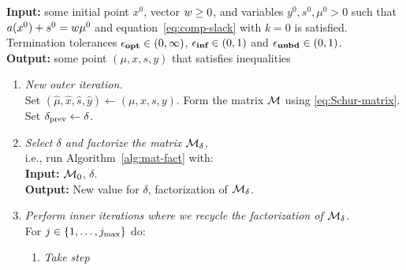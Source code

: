 \documentclass{article}
\begin{document}

\begin{algorithm}[H]
\textbf{Input:} some initial point $x^{0}$, vector $w \ge 0$, and variables $y^{0}, s^{0}, \mu^0 > 0$  such that $a(x^{0}) + s^{0} = w \mu^{0}$ and equation~\eqref{eq:comp-slack} with $k=0$ is satisfied. Termination tolerances $\epsilon_{\textbf{opt}} \in (0,\infty)$, $\epsilon_{\textbf{inf}} \in (0,1)$ and $\epsilon_{\textbf{unbd}} \in (0,1)$. \\
\textbf{Output:} some point $(\mu, x, s, y)$ that satisfies inequalities \termination{}
\vspace{0.1 cm} %
\begin{enumerate}[label*=A.{\arabic*}]
\item \label{line:form-K}  \emph{New outer iteration.} \\
Set $(\hat{\mu}, \hat{x}, \hat{s}, \hat{y}) \gets (\mu, x, s, y)$. Form the matrix $\mathcal{M}$ using \eqref{eq:Schur-matrix}. Set $\delta_{\text{prev}} \gets \delta$.
\item \emph{Select $\delta$ and factorize the matrix $\mathcal{M}_{\delta}$,} \\
i.e., run Algorithm~\ref{alg:mat-fact} with: \\
\hspace*{0.1cm}  \textbf{Input:} $\mathcal{M}_{0}$, $\delta$. \\
\hspace*{0.1cm} \textbf{Output:} New value for $\delta$, factorization of $\mathcal{M}_{\delta}$.
\item \label{take-steps}  \emph{Perform inner iterations where we recycle the factorization of $\mathcal{M}_{\delta}$.} \\
For $j \in \{ 1, \dots , j_{\max} \}$ do:
\begin{enumerate}[label*=.{\arabic*}]
\item \emph{Take step}\label{line:take-step}
\begin{enumerate}[label=-Case {\Roman*}]

\end{enumerate}
\end{enumerate}
\end{enumerate}
\end{algorithm}
\end{document}
